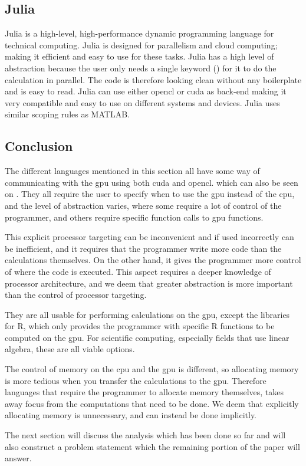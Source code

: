 \subsection{Julia}
Julia is a high-level, high-performance dynamic programming language for technical computing.
Julia is designed for parallelism and cloud computing; making it efficient and easy to use for these tasks.
Julia has a high level of abstraction because the user only needs a single keyword (\@parallel) for it to do the calculation in parallel.
The code is therefore looking clean without any boilerplate and is easy to read.
Julia can use either \gls{opencl} or \gls{cuda} as back-end making it very compatible and easy to use on different systems and devices.
Julia uses similar scoping rules as MATLAB. \citep{Julia_Git, Julia_scope,Julia}

 

\subsection{Conclusion}  

The different languages mentioned in this section all have some way of communicating with the \acrshort{gpu} using both \gls{cuda} and \gls{opencl}. which can also be seen on .
They all require the user to specify when to use the \acrshort{gpu} instead of the \acrshort{cpu}, and the level of abstraction varies, where some require a lot of control of the programmer, and others require specific function calls to \acrshort{gpu} functions.

This explicit processor targeting can be inconvenient and if used incorrectly can be inefficient, and it requires that the programmer write more code than the calculations themselves.
On the other hand, it gives the programmer more control of where the code is executed.
This aspect requires a deeper knowledge of processor architecture, and we deem that greater abstraction is more important than the control of processor targeting.

They are all usable for performing calculations on the \acrshort{gpu}, except the libraries for R, which only provides the programmer with specific R functions to be computed on the \acrshort{gpu}. 
For scientific computing, especially fields that use linear algebra, these are all viable options.

The control of memory on the \acrshort{cpu} and the \acrshort{gpu} is different, so allocating memory is more tedious when you transfer the calculations to the \acrshort{gpu}.
Therefore languages that require the programmer to allocate memory themselves, takes away focus from the computations that need to be done.
We deem that explicitly allocating memory is unnecessary, and can instead be done implicitly.

The next section will discuss the analysis which has been done so far and will also construct a problem statement which the remaining portion of the paper will answer.